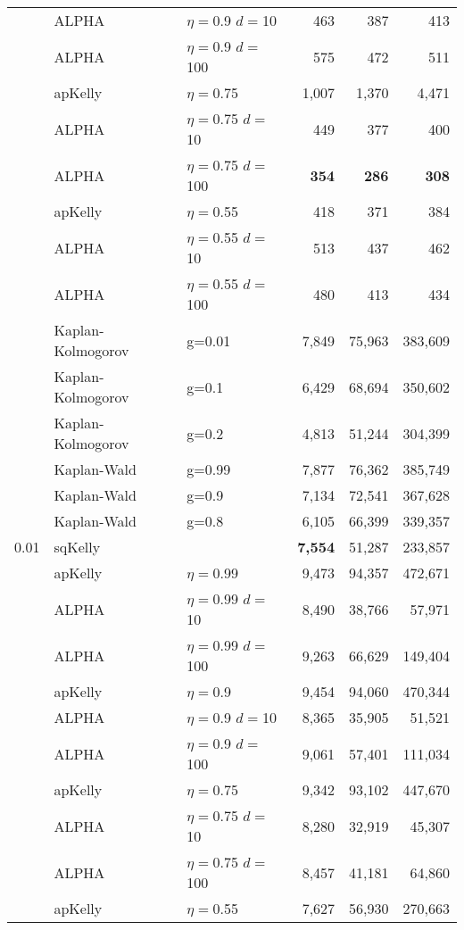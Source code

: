 \documentclass[12pt,runningheads]{llncs}
\begin{document}
{\begin{table}
\begin{tabular}{lll|rrr}
\cline{2-6}
& ALPHA & $\eta=$0.9 $d=$10 & 463  & 387  & 413  \\
& ALPHA & $\eta=$0.9 $d=$100 & 575  & 472  & 511  \\
\cline{2-6} & apKelly & $\eta=$0.75 & 1,007  & 1,370  & 4,471  \\
\cline{2-6}
& ALPHA & $\eta=$0.75 $d=$10 & 449  & 377  & 400  \\
& ALPHA & $\eta=$0.75 $d=$100 & \bf{354}  & \bf{286}  & \bf{308}  \\
\cline{2-6} & apKelly & $\eta=$0.55 & 418  & 371  & 384  \\
\cline{2-6}
& ALPHA & $\eta=$0.55 $d=$10 & 513  & 437  & 462  \\
& ALPHA & $\eta=$0.55 $d=$100 & 480  & 413  & 434  \\
\cline{2-6}
 & Kaplan-Kolmogorov & g=0.01 & 7,849  & 75,963  & 383,609  \\
 & Kaplan-Kolmogorov & g=0.1 & 6,429  & 68,694  & 350,602  \\
 & Kaplan-Kolmogorov & g=0.2 & 4,813  & 51,244  & 304,399  \\
\cline{2-6}
 & Kaplan-Wald & g=0.99 & 7,877  & 76,362  & 385,749  \\
 & Kaplan-Wald & g=0.9 & 7,134  & 72,541  & 367,628  \\
 & Kaplan-Wald & g=0.8 & 6,105  & 66,399  & 339,357  \\
\hline 0.01 & sqKelly & & \bf{7,554}  & 51,287  & 233,857  \\
\cline{2-6} & apKelly & $\eta=$0.99 & 9,473  & 94,357  & 472,671  \\
\cline{2-6}
& ALPHA & $\eta=$0.99 $d=$10 & 8,490  & 38,766  & 57,971  \\
& ALPHA & $\eta=$0.99 $d=$100 & 9,263  & 66,629  & 149,404  \\
\cline{2-6} & apKelly & $\eta=$0.9 & 9,454  & 94,060  & 470,344  \\
\cline{2-6}
& ALPHA & $\eta=$0.9 $d=$10 & 8,365  & 35,905  & 51,521  \\
& ALPHA & $\eta=$0.9 $d=$100 & 9,061  & 57,401  & 111,034  \\
\cline{2-6} & apKelly & $\eta=$0.75 & 9,342  & 93,102  & 447,670  \\
\cline{2-6}
& ALPHA & $\eta=$0.75 $d=$10 & 8,280  & 32,919  & 45,307  \\
& ALPHA & $\eta=$0.75 $d=$100 & 8,457  & 41,181  & 64,860  \\
\cline{2-6} & apKelly & $\eta=$0.55 & 7,627  & 56,930  & 270,663  \\

\end{tabular}
\end{table}}
\end{document}
